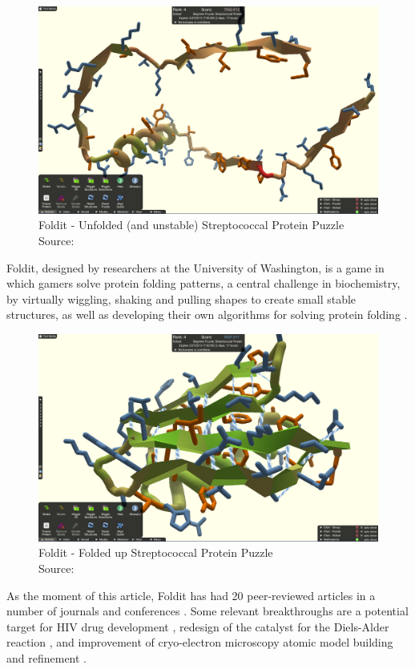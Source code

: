 \begin{figure}[ht]
    \centering
    \includegraphics[width=0.8\linewidth]{images/background/foldit-problem.png}
    \caption{Foldit - Unfolded (and unstable) Streptococcal Protein Puzzle \\ Source: \cite{foldit-protein-problem}}
    \label{fig:foldit-problem}
\end{figure}

Foldit, designed by researchers at the University of Washington, is a game in which gamers solve protein folding patterns, a central challenge in biochemistry, by virtually wiggling, shaking and pulling shapes to create small stable structures, as well as developing their own algorithms for solving protein folding \cite{bourzac2008enlisting}. 

\begin{figure}[ht]
    \centering
    \includegraphics[width=0.8\linewidth]{images/background/foldit-solution.png}
    \caption{Foldit - Folded up Streptococcal Protein Puzzle \\ Source: \cite{foldit-protein-solution}}
    \label{fig:foldit-solution}
\end{figure}

As the moment of this article, Foldit has had 20 peer-reviewed articles in a number of journals and conferences \cite{foldit2021publications}. Some relevant breakthroughs are a potential target for HIV drug development \cite{khatib2011crystal}, redesign of the catalyst for the Diels-Alder reaction \cite{eiben2012increased}, and improvement of cryo-electron microscopy atomic model building and refinement \cite{khatib2019building}.

